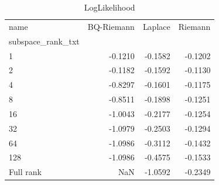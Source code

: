 \begin{table}[H]
\caption{LogLikelihood}
\begin{tabular}{lrrr}
\toprule
name & BQ-Riemann & Laplace & Riemann \\
subspace_rank_txt &  &  &  \\
\midrule
1 & -0.1210 & -0.1582 & -0.1202 \\
2 & -0.1182 & -0.1592 & -0.1130 \\
4 & -0.8297 & -0.1601 & -0.1175 \\
8 & -0.8511 & -0.1898 & -0.1251 \\
16 & -1.0043 & -0.2177 & -0.1254 \\
32 & -1.0979 & -0.2503 & -0.1294 \\
64 & -1.0986 & -0.3112 & -0.1432 \\
128 & -1.0986 & -0.4575 & -0.1533 \\
Full rank & NaN & -1.0592 & -0.2349 \\
\bottomrule
\end{tabular}
\end{table}
